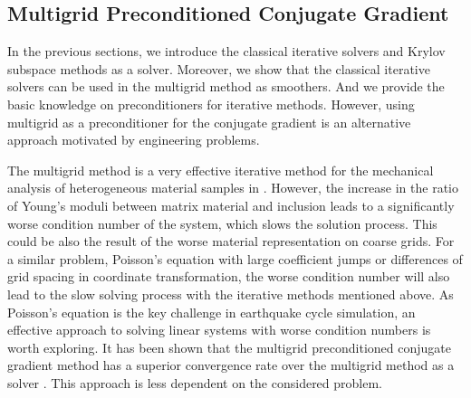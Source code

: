 \subsection{Multigrid Preconditioned Conjugate Gradient}
In the previous sections, we introduce the classical iterative solvers and Krylov subspace methods as a solver. Moreover, we show that the classical iterative solvers can be used in the multigrid method as smoothers. And we provide the basic knowledge on preconditioners for iterative methods. However, using multigrid as a preconditioner for the conjugate gradient is an alternative approach motivated by engineering problems.

The multigrid method is a very effective iterative method for the mechanical analysis of heterogeneous material samples in \citep{hafner2006mesoscale}. However, the increase in the ratio of Young's moduli between matrix material and inclusion leads to a significantly worse condition number of the system, which slows the solution process. This could be also the result of the worse material representation on coarse grids. For a similar problem, Poisson's equation with large coefficient jumps or differences of grid spacing in coordinate transformation, the worse condition number will also lead to the slow solving process with the iterative methods mentioned above. As Poisson's equation is the key challenge in earthquake cycle simulation, an effective approach to solving linear systems with worse condition numbers is worth exploring. It has been shown that the multigrid preconditioned conjugate gradient method has a superior convergence rate over the multigrid method as a solver \citep{tatebe1993multigrid}. This approach is less dependent on the considered problem.


